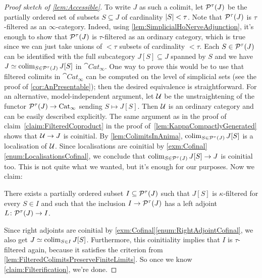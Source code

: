 \begin{proof}[Proof sketch of \cref{lem:Accessible}]
	To write $J$ as such a colimit, let $\mathcal{P}^\tau(J)$ be the partially ordered set of subsets $S\subseteq J$ of cardinality $\abs*{S}<\tau$. Note that $\mathcal{P}^\tau(J)$ is $\tau$-filtered as an $\infty$-category. Indeed, using \cref{lem:SimplicialHoNerveAdjunction}, it's enough to show that $\mathcal{P}^\tau(J)$ is $\tau$-filtered as an ordinary category, which is true since we can just take unions of $<\tau$ subsets of cardinality $<\tau$. Each $S\in\mathcal{P}^\tau(J)$ can be identified with the full subcategory $J[S]\subseteq J$ spanned by $S$ and we have $J\simeq \operatorname*{colim}_{S\in\mathcal{P}^\tau(J)}J[S]$ in $\cat{Cat}_\infty$. One way to prove this would be to use that filtered colimits in $\cat{Cat}_\infty$ can be computed on the level of simplicial sets (see the proof of \cref{cor:AnPresentable}); then the desired equivalence is straightforward. For an alternative, model-independent argument, let $\mathcal{U}$ be the unstraightening of the functor $\mathcal{P}^\tau(J)\rightarrow \mathrm{Cat}_\infty$ sending $S\mapsto J[S]$. Then $\mathcal{U}$ is an ordinary category and can be easily described explicitly. The same argument as in the proof of claim~\cref{claim:FilteredCoproduct} in the proof of~\cref{lem:KappaCompactlyGenerated} shows that $\mathcal{U}\rightarrow J$ is coinitial. By \cref{lem:ColimitsInAnima}, $\operatorname*{colim}_{S\in\mathcal{P}^\tau(J)}J[S]$ is a localisation of $\mathcal{U}$. Since localisations are coinitial by  \cref{exm:Cofinal}\cref{enum:LocalisationsCofinal}, we conclude that $\operatorname*{colim}_{S\in\mathcal{P}^\tau(J)}J[S]\rightarrow J$ is coinitial too. This is not quite what we wanted, but it's enough for our purposes. Now we claim:
	\begin{alphanumerate}\itshape
		\item[\boxtimes] \!There exists a partially ordered subset $I\subseteq \mathcal{P}^\tau(J)$ such that $J[S]$ is $\kappa$-filtered for every $S\in I$ and such that the inclusion $I\rightarrow\mathcal{P}^\tau(J)$ has a left adjoint $L\colon \mathcal{P}^\tau(J)\rightarrow I$.\label{claim:Filterification}
	\end{alphanumerate}
	Since right adjoints are coinitial by \cref{exm:Cofinal}\cref{enum:RightAdjointCofinal}, we also get $J\simeq \operatorname*{colim}_{S\in I}J[S]$. Furthermore, this coinitiality implies that $I$ is $\tau$-filtered again, because it satisfies the criterion from \cref{lem:FilteredColimitsPreserveFiniteLimits}. So once we know \cref{claim:Filterification}, we're done.
	

\end{proof}
